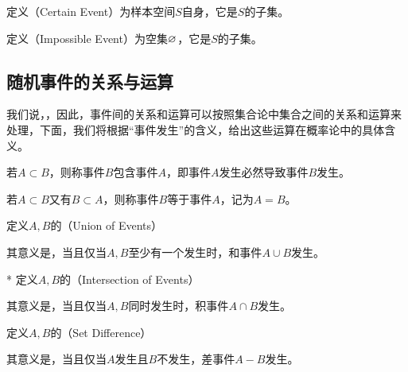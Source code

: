 \begin{BoxDefinition}[必然事件]
    定义（Certain Event）为样本空间$S$自身，它是$S$的子集。
\end{BoxDefinition}
\begin{BoxDefinition}[不可能事件]
    定义（Impossible Event）为空集$\varnothing$，它是$S$的子集。
\end{BoxDefinition}

\subsection{随机事件的关系与运算}
我们说，，因此，事件间的关系和运算可以按照集合论中集合之间的关系和运算来处理，下面，我们将根据“事件发生”的含义，给出这些运算在概率论中的具体含义。

\begin{BoxDefinition}[事件的包含]
    若$A\subset B$，则称事件$B$包含事件$A$，即事件$A$发生必然导致事件$B$发生。
\end{BoxDefinition}

\begin{BoxDefinition}[事件的相等]
    若$A\subset B$又有$B\subset A$，则称事件$B$等于事件$A$，记为$A=B$。
\end{BoxDefinition}

\begin{BoxDefinition}[和事件]
    定义$A,B$的（Union of Events）
    其意义是，当且仅当$A,B$至少有一个发生时，和事件$A\cup B$发生。
\end{BoxDefinition}

\begin{BoxDefinition}[积事件]*
    定义$A,B$的（Intersection of Events）
    其意义是，当且仅当$A,B$同时发生时，积事件$A\cap B$发生。
\end{BoxDefinition}

\begin{BoxDefinition}[差事件]
    定义$A,B$的（Set Difference）
    其意义是，当且仅当$A$发生且$B$不发生，差事件$A-B$发生。
\end{BoxDefinition}

